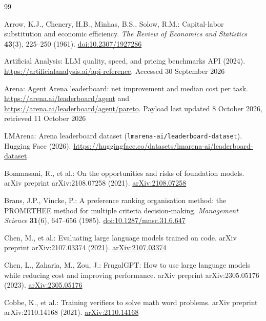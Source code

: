 \documentclass[pdflatex,sn-mathphys-num]{sn-jnl}
\theoremstyle{thmstyleone}
\theoremstyle{thmstylethree}
\begin{document}
\begin{thebibliography}{99}

Arrow, K.J., Chenery, H.B., Minhas, B.S., Solow, R.M.: Capital-labor substitution and economic efficiency. \emph{The Review of Economics and Statistics} \textbf{43}(3), 225--250 (1961). \href{https://doi.org/10.2307/1927286}{doi:10.2307/1927286}

Artificial Analysis: LLM quality, speed, and pricing benchmarks API (2024). \href{https://artificialanalysis.ai/api-reference}{https://artificialanalysis.ai/api-reference}. Accessed 30 September 2026

Arena: Agent Arena leaderboard: net improvement and median cost per task. \href{https://arena.ai/leaderboard/agent}{https://arena.ai/leaderboard/agent} and \href{https://arena.ai/leaderboard/agent/pareto}{https://arena.ai/leaderboard/agent/pareto}. Payload last updated 8 October 2026, retrieved 11 October 2026

LMArena: Arena leaderboard dataset (\texttt{lmarena-ai/leaderboard-dataset}). Hugging Face (2026). \href{https://huggingface.co/datasets/lmarena-ai/leaderboard-dataset}{https://huggingface.co/datasets/lmarena-ai/leaderboard-dataset}

Bommasani, R., et al.: On the opportunities and risks of foundation models. arXiv preprint arXiv:2108.07258 (2021). \href{https://arxiv.org/abs/2108.07258}{arXiv:2108.07258}

Brans, J.P., Vincke, P.: A preference ranking organisation method: the PROMETHEE method for multiple criteria decision-making. \emph{Management Science} \textbf{31}(6), 647--656 (1985). \href{https://doi.org/10.1287/mnsc.31.6.647}{doi:10.1287/mnsc.31.6.647}

Chen, M., et al.: Evaluating large language models trained on code. arXiv preprint arXiv:2107.03374 (2021). \href{https://arxiv.org/abs/2107.03374}{arXiv:2107.03374}

Chen, L., Zaharia, M., Zou, J.: FrugalGPT: How to use large language models while reducing cost and improving performance. arXiv preprint arXiv:2305.05176 (2023). \href{https://arxiv.org/abs/2305.05176}{arXiv:2305.05176}

Cobbe, K., et al.: Training verifiers to solve math word problems. arXiv preprint arXiv:2110.14168 (2021). \href{https://arxiv.org/abs/2110.14168}{arXiv:2110.14168}


\end{thebibliography}
\end{document}
